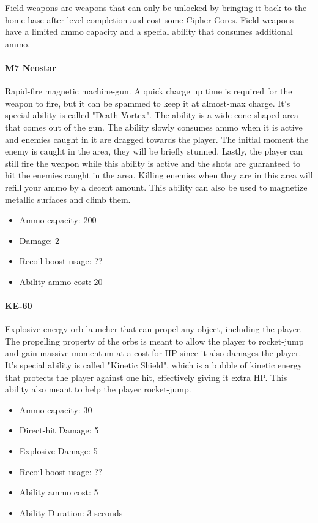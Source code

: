 \documentclass[12pt]{article}
\begin{document}
Field weapons are weapons that can only be unlocked by bringing it back to the home base after level completion and cost some Cipher Cores. Field weapons have a limited ammo capacity and a special ability that consumes additional ammo. 

\paragraph{M7 Neostar}

Rapid-fire magnetic machine-gun. A quick charge up time is required for the weapon to fire, but it can be spammed to keep it at almost-max charge. It's special ability is called "Death Vortex". The ability is a wide cone-shaped area that comes out of the gun. The ability slowly consumes ammo when it is active and enemies caught in it are dragged towards the player. The initial moment the enemy is caught in the area, they will be briefly stunned. Lastly, the player can still fire the weapon while this ability is active and the shots are guaranteed to hit the enemies caught in the area. Killing enemies when they are in this area will refill your ammo by a decent amount. This ability can also be used to magnetize metallic surfaces and climb them. 

\begin{itemize}
	\item Ammo capacity: 200
	\item Damage: 2
	\item Recoil-boost usage: ??
	\item Ability ammo cost: 20
\end{itemize}


\paragraph{KE-60}

Explosive energy orb launcher that can propel any object, including the player. The propelling property of the orbs is meant to allow the player to rocket-jump and gain massive momentum at a cost for HP since it also damages the player. It's special ability is called "Kinetic Shield", which is a bubble of kinetic energy that protects the player against one hit, effectively giving it extra HP. This ability also meant to help the player rocket-jump. 

\begin{itemize}
	\item Ammo capacity: 30
	\item Direct-hit Damage: 5
	\item Explosive Damage: 5
	\item Recoil-boost usage: ??
	\item Ability ammo cost: 5
	\item Ability Duration: 3 seconds
\end{itemize} 
\end{document}

